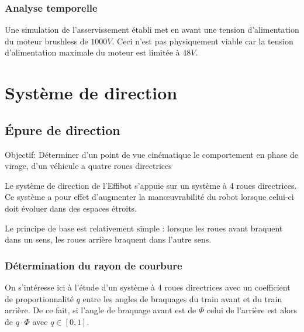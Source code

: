 

\subsubsection{Analyse temporelle}

Une simulation de l'asservissement établi met en avant une tension d'alimentation du moteur brushless de $1000 V$. Ceci n'est pas physiquement viable car la tension d'alimentation maximale du moteur est limitée à $48 V$.


\section{Système de direction}

\subsection{Épure de direction}

Objectif: Déterminer d'un point de vue cinématique le comportement en phase de virage, d'un véhicule a quatre roues directrices

Le système de direction de l'\og Effibot \fg s'appuie sur un système à 4 roues directrices. Ce système a pour effet d'augmenter la man\oe uvrabilité du robot lorsque celui-ci doit évoluer dans des espaces étroits.

Le principe de base est relativement simple : lorsque les roues avant braquent dans un sens, les roues arrière braquent dans l'autre sens.

\subsubsection{Détermination du rayon de courbure}

On s'intéresse ici à l'étude d'un système à 4 roues directrices avec un coefficient de proportionnalité $q$ entre les angles de braquages du train avant et du train arrière. De ce fait, si l'angle de braquage avant est de $\Phi$ celui de l'arrière est alors de $q\cdot\Phi$ avec $q\in[0,1]$.

